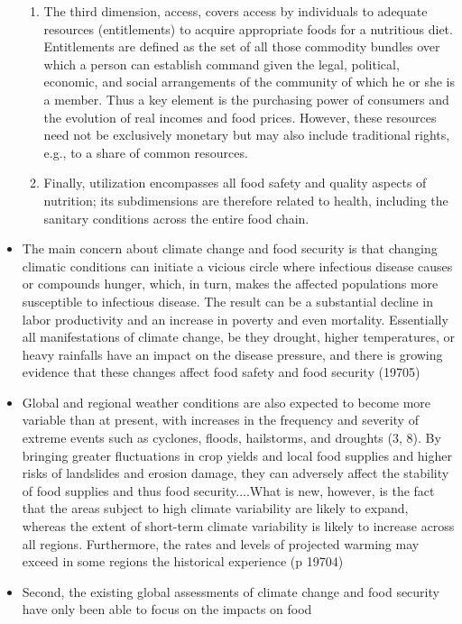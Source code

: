 \documentclass[twoside]{article}	%
\begin{document}
\begin{itemize}
\begin{enumerate}
    \item The third dimension, access, covers access by individuals to adequate resources (entitlements) to acquire appropriate foods for a nutritious diet. Entitlements are defined as the set of all those commodity bundles over which a person can establish command given the legal, political, economic, and social arrangements of the community of which he or she is a member. Thus a key element is the purchasing power of consumers and the evolution of real incomes and food prices. However, these resources need not be exclusively monetary but may also include traditional rights, e.g., to a share of common resources.
    \item Finally, utilization encompasses all food safety and quality aspects of nutrition; its subdimensions are therefore related to health, including the sanitary conditions across the entire food chain.
  \end{enumerate}   
  \item The main concern about climate change and food security is that changing climatic conditions can initiate a vicious circle where infectious disease causes or compounds hunger, which, in turn, makes the affected populations more susceptible to infectious disease. The result can be a substantial decline in labor productivity and an increase in poverty and even mortality. Essentially all manifestations of climate change, be they drought, higher temperatures, or heavy rainfalls have an impact on the disease pressure, and there is growing evidence that these changes affect food safety and food security (19705)
  \item Global and regional weather conditions are also expected to become more variable than at present, with increases in the frequency and severity of extreme events such as cyclones, floods, hailstorms, and droughts (3, 8). By bringing greater fluctuations in crop yields and local food supplies and higher risks of landslides and erosion damage, they can adversely affect the stability of food supplies and thus food security....What is new, however, is the fact that the areas subject to high climate variability are likely to expand, whereas the extent of short-term climate variability is likely to increase across all regions. Furthermore, the rates and levels of projected warming may exceed in some regions the historical experience (p 19704)
  \item Second, the existing global assessments of climate change and food security have only been able to focus on the impacts on food

\end{itemize}
\end{document}

